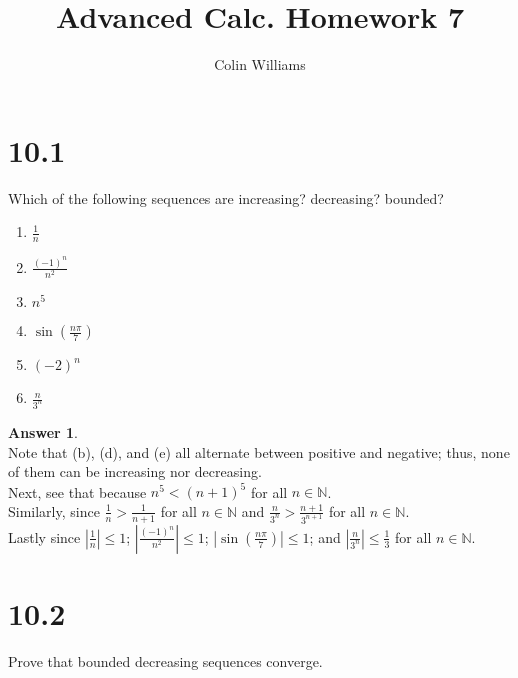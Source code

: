 \documentclass[10pt,a4paper]{article}
\title{Advanced Calc. Homework 7}
\author{Colin Williams}
\theoremstyle{definition}
\newtheorem*{answer*}{Answer}
\begin{document}
\maketitle

\section*{10.1}
Which of the following sequences are increasing? decreasing? bounded?
\begin{enumerate}[label = (\alph*)]
\item $\displaystyle \frac{1}{n}$
\item $\displaystyle \frac{(-1)^n}{n^2}$
\item $\displaystyle n^5$
\item $\displaystyle \sin\left(\frac{n\pi}{7}\right)$
\item $\displaystyle (-2)^n$
\item $\displaystyle \frac{n}{3^n}$
\end{enumerate}

\begin{answer*}{$ $}
\\Note that (b), (d), and (e) all alternate between positive and negative; thus, none of them can be increasing nor decreasing.
\\Next, see that  because $n^5 < (n + 1)^5$ for all $n \in \mathbb{N}$.
\\Similarly,  since $\frac{1}{n} > \frac{1}{n + 1}$ for all $n \in \mathbb{N}$ and $\frac{n}{3^n} > \frac{n + 1}{3^{n + 1}}$ for all $n \in \mathbb{N}$.
\\Lastly {} since $\left|\frac{1}{n}\right| \leq 1$; $\left|\frac{(-1)^n}{n^2}\right| \leq 1$; $\left|\sin\left(\frac{n\pi}{7}\right)\right| \leq 1$; and $\left|\frac{n}{3^n}\right| \leq \frac{1}{3}$ for all $n \in \mathbb{N}$.
\end{answer*}

\section*{10.2}
Prove that bounded decreasing sequences converge.
\end{document}
